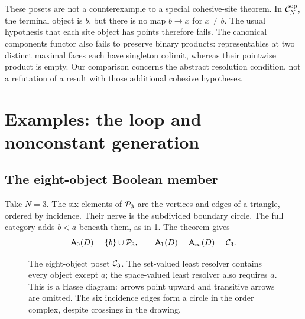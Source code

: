 These posets are not a counterexample to a special cohesive-site theorem.
In $\mathcal C_N^{\mathrm{op}}$, the terminal object is $b$, but there is no
map $b\to x$ for $x\ne b$. The usual hypothesis that each site object
has points therefore fails. The canonical components functor also fails
to preserve binary products: representables at two distinct maximal
faces each have singleton colimit, whereas their pointwise product is
empty. Our comparison concerns the abstract resolution condition, not
a refutation of a result with those additional cohesive hypotheses.

\section{Examples: the loop and nonconstant generation}
\label{sec:example}

\subsection{The eight-object Boolean member}

Take $N=3$. The six elements of $\mathcal P_3$ are the vertices and edges of
a triangle, ordered by incidence. Their nerve is the subdivided boundary
circle. The full category adds $b<a$ beneath them, as in
\cref{fig:eight}. The theorem gives
\[
\mathsf A_0(D)=\{b\}\cup\mathcal P_3,\qquad
\mathsf A_1(D)=\mathsf A_\infty(D)=\mathcal C_3.
\]

\begin{figure}[htbp]
\centering
{}
\caption{The eight-object poset $\mathcal C_3$. The set-valued least resolver
contains every object except $a$; the space-valued least resolver also
requires $a$. This is a Hasse diagram: arrows point upward and transitive
arrows are omitted. The six incidence edges form a circle in the order
complex, despite crossings in the drawing.}
\label{fig:eight}
\end{figure}

